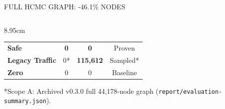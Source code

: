\documentclass[aspectratio=169,10pt]{beamer}
\begin{document}
\begin{frame}{FULL HCMC GRAPH: -46.1\% NODES}
\begin{columns}[T,onlytextwidth]
\begin{column}{8.95cm}
{\begin{tabular}{@{}>{\bfseries\color{NavIvory}}lccc@{}}
        \midrule
        Safe & \color{NavTeal}\textbf{0} & \color{NavTeal}\textbf{0} & \color{NavTeal}Proven \\
        Legacy Traffic & 0* & \color{NavCrimson}\textbf{115,612} & \color{NavAmber}Sampled* \\
        Zero & 0 & 0 & Baseline \\
        \bottomrule
      \end{tabular}%
    }\par
    \vspace{0.05cm}
    {\fontsize{6.8}{8.5}\selectfont\color{NavMuted}*Scope A: Archived v0.3.0 full 44,178-node graph (\texttt{report/evaluation-summary.json}).}%
  \end{column}
\end{columns}
\end{frame}
\end{document}
